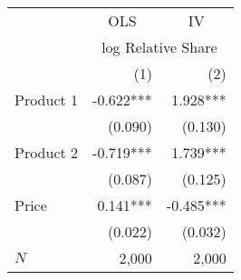 \begin{tabular}{lrr}
\toprule
          & \multicolumn{1}{c}{OLS} & \multicolumn{1}{c}{IV} \\ 
\cmidrule(lr){2-2} \cmidrule(lr){3-3} 
          &      \multicolumn{2}{c}{log Relative Share}      \\ 
\cmidrule(lr){2-3} 
          &                     (1) &                    (2) \\ 
\midrule
Product 1 &               -0.622*** &               1.928*** \\ 
          &                 (0.090) &                (0.130) \\ 
Product 2 &               -0.719*** &               1.739*** \\ 
          &                 (0.087) &                (0.125) \\ 
Price     &                0.141*** &              -0.485*** \\ 
          &                 (0.022) &                (0.032) \\ 
\midrule
$N$       &                   2,000 &                  2,000 \\ 
\bottomrule
\end{tabular}
